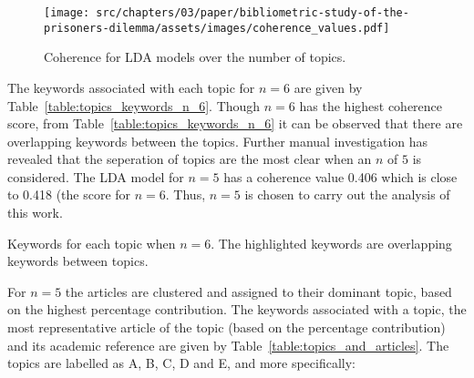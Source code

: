\begin{figure}[!hbtp]
    \centering
    \texttt{[image: src/chapters/03/paper/bibliometric-study-of-the-prisoners-dilemma/assets/images/coherence\_values.pdf]}
    \caption{Coherence for LDA models over the number of topics.}
    \label{fig:coherence_value_over_number_of_topcis}
\end{figure}

The keywords associated with each topic for \(n=6\) are given by
Table~\ref{table:topics_keywords_n_6}. Though \(n=6\) has the highest coherence
score, from Table~\ref{table:topics_keywords_n_6} it can be observed that there
are overlapping keywords between the topics. Further manual investigation has
revealed that the seperation of topics are the most clear when an \(n\) of \(5\)
is considered. The LDA model for \(n=5\) has a coherence value 0.406 which is
close to 0.418 (the score for \(n=6\). Thus, \(n=5\) is chosen to carry out the analysis of this work.


\begin{table}[!hbtp]
    \begin{center}
    \resizebox{\textwidth}{!}{
    }
    \end{center}
    \caption{Keywords for each topic when \(n=6\). The highlighted keywords are overlapping keywords between topics.}
    \label{table:topics_keywords_n_6}
\end{table}

For \(n=5\) the articles are clustered and assigned to their dominant topic,
based on the highest percentage contribution. The keywords associated with a
topic, the most representative article of the topic (based on the
percentage contribution) and its academic reference are given by
Table~\ref{table:topics_and_articles}. The topics are labelled as A, B, C, D and
E, and more specifically:

